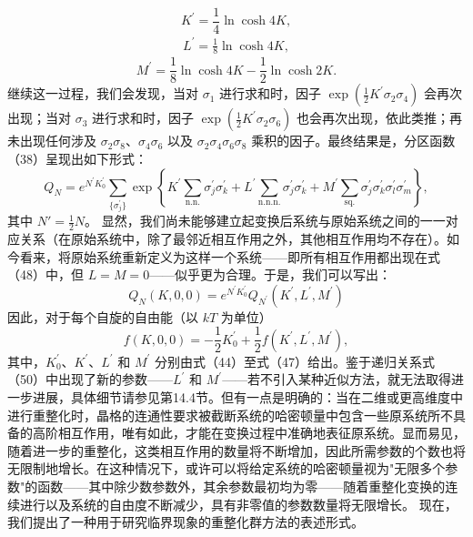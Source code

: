 \begin{equation}\tag{14.2.56}\label{eq:14.2.56}
K ^{\prime} = \frac { 1 } { 4 } \ln \cosh 4 K ,
\end{equation}
\begin{equation}\tag{14.2.57}\label{eq:14.2.57}
\begin{array}{r} { L ^{\prime} = \frac { 1 } { 8 } \ln \cosh 4 K , } \end{array}
\end{equation}
\begin{equation}\tag{14.2.58}\label{eq:14.2.58}
M ^{\prime} = \frac { 1 } { 8 } \ln \cosh 4 K - \frac { 1 } { 2 } \ln \cosh 2 K .
\end{equation}
继续这一过程，我们会发现，当对 \(\sigma_{1}\) 进行求和时，因子 \(\exp\left(\frac{1}{2}K^{\prime}\sigma_{2}\sigma_{4}\right)\) 会再次出现；当对 \(\sigma_{3}\) 进行求和时，因子 \(\exp\left(\frac{1}{2}K^{\prime}\sigma_{2}\sigma_{6}\right)\) 也会再次出现，依此类推；再未出现任何涉及 \(\sigma_{2}\sigma_{8}\)、\(\sigma_{4}\sigma_{6}\) 以及 \(\sigma_{2}\sigma_{4}\sigma_{6}\sigma_{8}\) 乘积的因子。最终结果是，分区函数（38）呈现出如下形式：
\begin{equation}\tag{14.2.59}\label{eq:14.2.59}
Q _ { N } = e ^{N ^ { \prime} K _ { 0 } ^{\prime} } \sum _ { \{ \sigma _ { j } ^{\prime} \} } \exp \left\{ K ^{\prime} \sum _ { \mathrm { n . n . } } \sigma _ { j } ^{\prime} \sigma _ { k } ^{\prime} + L ^{\prime} \sum _ { \mathrm { n . n . n . } } \sigma _ { j } ^{\prime} \sigma _ { k } ^{\prime} + M ^{\prime} \sum _ { \mathrm { s q . } } \sigma _ { j } ^{\prime} \sigma _ { k } ^{\prime} \sigma _ { l } ^{\prime} \sigma _ { m } ^{\prime} \right\} ,
\end{equation}
其中 \(N' = \frac{1}{2}N\)。
显然，我们尚未能够建立起变换后系统与原始系统之间的一一对应关系（在原始系统中，除了最邻近相互作用之外，其他相互作用均不存在）。如今看来，将原始系统重新定义为这样一个系统——即所有相互作用都出现在式（48）中，但 \(L=M=0\)——似乎更为合理。于是，我们可以写出：
\begin{equation}\tag{14.2.60}\label{eq:14.2.60}
Q _ { N } ( K , 0 , 0 ) = e ^{N ^ { \prime} K _ { 0 } ^{\prime} } Q _ { N ^{\prime} } ( K ^{\prime} , L ^{\prime} , M ^{\prime} )
\end{equation}
因此，对于每个自旋的自由能（以 \(kT\) 为单位）
\begin{equation}\tag{14.2.61}\label{eq:14.2.61}
f ( K , 0 , 0 ) = - \frac { 1 } { 2 } K _ { 0 } ^{\prime} + \frac { 1 } { 2 } f ( K ^{\prime} , L ^{\prime} , M ^{\prime} ) ,
\end{equation}
其中，\(K_{0}^{\prime}\)、\(K^{\prime}\)、\(L^{\prime}\) 和 \(M^{\prime}\) 分别由式（44）至式（47）给出。鉴于递归关系式（50）中出现了新的参数——\(L^{\prime}\) 和 \(M^{\prime}\)——若不引入某种近似方法，就无法取得进一步进展，具体细节请参见第14.4节。但有一点是明确的：当在二维或更高维度中进行重整化时，晶格的连通性要求被截断系统的哈密顿量中包含一些原系统所不具备的高阶相互作用，唯有如此，才能在变换过程中准确地表征原系统。显而易见，随着进一步的重整化，这类相互作用的数量将不断增加，因此所需参数的个数也将无限制地增长。在这种情况下，或许可以将给定系统的哈密顿量视为"无限多个参数"的函数——其中除少数参数外，其余参数最初均为零——随着重整化变换的连续进行以及系统的自由度不断减少，具有非零值的参数数量将无限增长。
现在，我们提出了一种用于研究临界现象的重整化群方法的表述形式。
